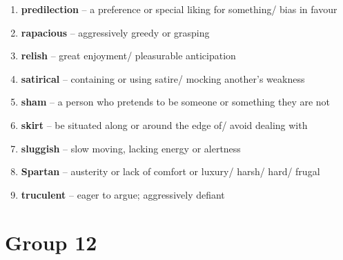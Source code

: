 \begin{enumerate}[wide,labelindent=0pt]
\item \textbf{predilection} -- a preference or special liking for something/ bias in favour
\item \textbf{rapacious} -- aggressively greedy or grasping
\item \textbf{relish} -- great enjoyment/ pleasurable anticipation
\item \textbf{satirical} -- containing or using satire/ mocking another's weakness
\item \textbf{sham} -- a person who pretends to be someone or something they are not
\item \textbf{skirt} -- be situated along or around the edge of/ avoid dealing with
\item \textbf{sluggish} -- slow moving, lacking energy or alertness
\item \textbf{Spartan} -- austerity or lack of comfort or luxury/ harsh/ hard/ frugal
\item \textbf{truculent} -- eager to argue; aggressively defiant
\end{enumerate}

\newpage
\section{Group 12}

